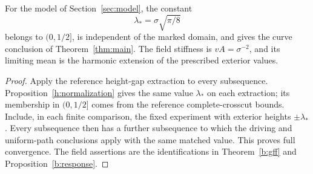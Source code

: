 \begin{corollary}[Universality]\label{h:assembly}
For the model of Section~\ref{sec:model}, the constant
\[
 \lambda_*=\sigma\sqrt{\pi/8}
\]
belongs to $(0,1/2]$, is independent of the marked domain, and gives
the curve conclusion of Theorem~\ref{thm:main}. The field stiffness
is $vA=\sigma^{-2}$, and its limiting mean is the harmonic extension
of the prescribed exterior values.
\end{corollary}
\begin{proof}
Apply the reference height-gap extraction to every subsequence.
Proposition~\ref{h:normalization} gives the same value $\lambda_*$
on each extraction; its membership in $(0,1/2]$ comes from the
reference complete-crosscut bounds. Include, in each finite comparison,
the fixed experiment with exterior heights $\pm\lambda_*$.
Every subsequence then has a further subsequence to which the driving
and uniform-path conclusions apply with the same matched value.
This proves full convergence. The field assertions are the
identifications in Theorem~\ref{b:gff} and
Proposition~\ref{b:response}.
\end{proof}
